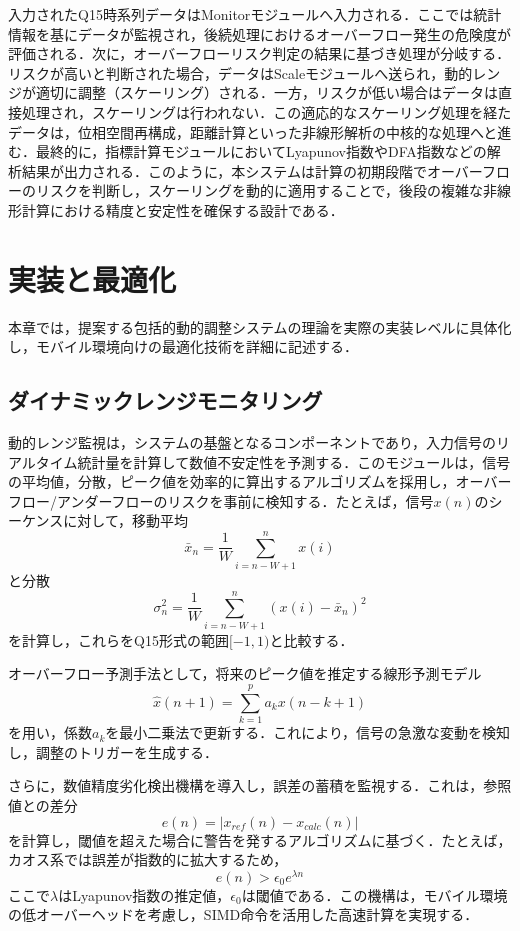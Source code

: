 \documentclass[10pt,journal,compsoc]{IEEEtran}
\begin{document}
入力されたQ15時系列データはMonitorモジュールへ入力される．ここでは統計情報を基にデータが監視され，後続処理におけるオーバーフロー発生の危険度が評価される．次に，オーバーフローリスク判定の結果に基づき処理が分岐する．リスクが高いと判断された場合，データはScaleモジュールへ送られ，動的レンジが適切に調整（スケーリング）される．一方，リスクが低い場合はデータは直接処理され，スケーリングは行われない．この適応的なスケーリング処理を経たデータは，位相空間再構成，距離計算といった非線形解析の中核的な処理へと進む．最終的に，指標計算モジュールにおいてLyapunov指数やDFA指数などの解析結果が出力される．このように，本システムは計算の初期段階でオーバーフローのリスクを判断し，スケーリングを動的に適用することで，後段の複雑な非線形計算における精度と安定性を確保する設計である．

\section{実装と最適化}

本章では，提案する包括的動的調整システムの理論を実際の実装レベルに具体化し，モバイル環境向けの最適化技術を詳細に記述する．

\subsection{ダイナミックレンジモニタリング}

動的レンジ監視は，システムの基盤となるコンポーネントであり，入力信号のリアルタイム統計量を計算して数値不安定性を予測する．このモジュールは，信号の平均値，分散，ピーク値を効率的に算出するアルゴリズムを採用し，オーバーフロー/アンダーフローのリスクを事前に検知する．たとえば，信号$x(n)$のシーケンスに対して，移動平均
\begin{equation}
\bar{x}_n = \frac{1}{W} \sum_{i=n-W+1}^{n} x(i)
\end{equation}
と分散
\begin{equation}
\sigma^2_n = \frac{1}{W} \sum_{i=n-W+1}^{n} (x(i) - \bar{x}_n)^2
\end{equation}
を計算し，これらをQ15形式の範囲$[-1, 1)$と比較する．

オーバーフロー予測手法として，将来のピーク値を推定する線形予測モデル
\begin{equation}
\hat{x}(n+1) = \sum_{k=1}^{p} a_k x(n-k+1)
\end{equation}
を用い，係数$a_k$を最小二乗法で更新する．これにより，信号の急激な変動を検知し，調整のトリガーを生成する．

さらに，数値精度劣化検出機構を導入し，誤差の蓄積を監視する．これは，参照値との差分
\begin{equation}
e(n) = |x_{ref}(n) - x_{calc}(n)|
\end{equation}
を計算し，閾値を超えた場合に警告を発するアルゴリズムに基づく．たとえば，カオス系では誤差が指数的に拡大するため，
\begin{equation}
e(n) > \epsilon_0 e^{\lambda n}
\end{equation}
ここで$\lambda$はLyapunov指数の推定値，$\epsilon_0$は閾値である．この機構は，モバイル環境の低オーバーヘッドを考慮し，SIMD命令を活用した高速計算を実現する．
\end{document}

